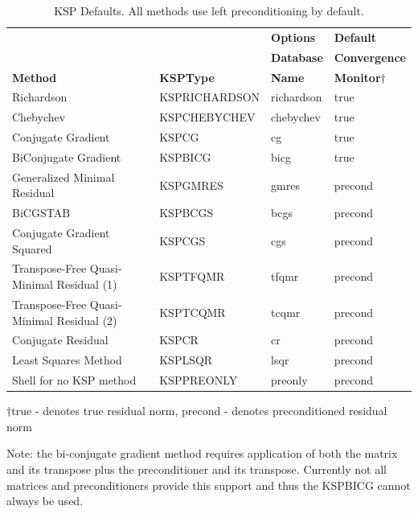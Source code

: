 \begin{table}
\begin{center}
\begin{tabular}{llll}
& & {\bf Options}       & {\bf Default}\\
& & {\bf Database}      & {\bf Convergence}\\
{\bf Method}    &{\bf KSPType}  & {\bf Name}    & {\bf Monitor$\dagger$}\\
\hline
Richardson                                & KSPRICHARDSON & richardson  & true\\
Chebychev                                 & KSPCHEBYCHEV  & chebychev   & true\\
Conjugate Gradient \cite{hs:52}           & KSPCG         & cg          & true\\
BiConjugate Gradient                      & KSPBICG       & bicg        & true\\
Generalized Minimal Residual \cite{ss:86} & KSPGMRES      & gmres       & precond\\
BiCGSTAB \cite{v:92}                      & KSPBCGS       & bcgs        & precond \\
Conjugate Gradient Squared \cite{so:89}   & KSPCGS        & cgs         & precond \\
Transpose-Free Quasi-Minimal Residual (1) \cite{f:93} & KSPTFQMR & tfqmr & precond \\
Transpose-Free Quasi-Minimal Residual (2) & KSPTCQMR & tcqmr & precond \\
Conjugate Residual                        & KSPCR         & cr          & precond \\
Least Squares Method                      & KSPLSQR       & lsqr        & precond \\
Shell for no KSP method                   & KSPPREONLY    & preonly     & precond \\
\hline
\end{tabular}
\medskip \medskip
$\dagger$true - denotes true residual norm, precond - denotes preconditioned residual norm
\end{center}
\caption{KSP Defaults.  All methods use left preconditioning by default.}
\label{tab_kspdefaults}
\end{table}

Note: the bi-conjugate gradient method requires application of both the matrix and 
its transpose plus the preconditioner and its transpose. Currently not all matrices
and preconditioners provide this support and thus the KSPBICG cannot always 
be used. 

